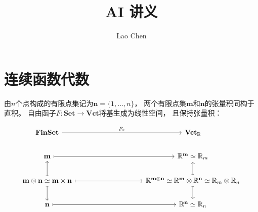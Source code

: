 \documentclass[10pt,a4paper]{article}
\begin{document}
\title{\textbf{AI 讲义}\\  }
\author{Lao Chen}
\maketitle
\setcounter{tocdepth}{1}
\tableofcontents

\section{连续函数代数}

由$n$个点构成的有限点集记为$\textbf{n} = \{ 1,\ldots,n \}$，
两个有限点集$\textbf{m}$和$\textbf{n}$的张量积同构于直积。
自由函子$F:\textbf{Set} \to \textbf{Vct}$将基生成为线性空间，
且保持张量积：

$$
\begin{tikzcd}
\textbf{FinSet} \arrow[rrrr, "F_\mathbb R"]                                                                               &  &  &  & \textbf{Vct}_\mathbb R                                                                                                                                                        \\
\textbf m \arrow[rrrr, maps to]                                                                                           &  &  &  & \mathbb R^\textbf m \simeq \mathbb R_m                                                                                                                                        \\
\textbf m \otimes \textbf n \simeq \textbf m \times \textbf n \arrow[u, maps to] \arrow[d, maps to] \arrow[rrrr, maps to] &  &  &  & \mathbb R^{\textbf{m} \otimes \textbf{n}} \simeq \mathbb R^\textbf m \otimes \mathbb R^\textbf n \simeq \mathbb R_m \otimes \mathbb R_n \arrow[u, maps to] \arrow[d, maps to] \\
\textbf n \arrow[rrrr, maps to]                                                                                           &  &  &  & \mathbb R^\textbf n \simeq \mathbb R_n                                                                                                                                       
\end{tikzcd}
$$
\end{document}
